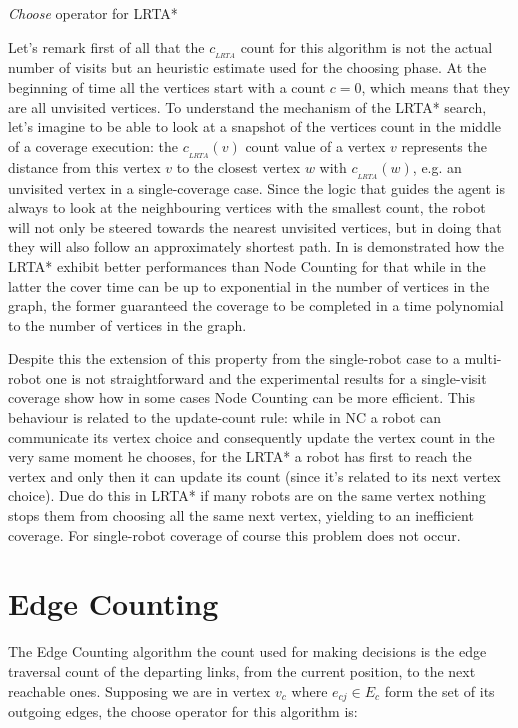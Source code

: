 \begin{algorithm}
\begin{algorithmic}[1]
 \label{a:find_next_lrta}
\label{eq:lrta_rule}
\end{algorithmic}
\caption{\emph{Choose} operator for LRTA*}\label{alg:rt_lrta}
\end{algorithm}

Let's remark first of all that the $c_{_{LRTA}}$ count for this algorithm is not the actual number of visits but an heuristic estimate used for the choosing phase. At the beginning of time all the vertices start with a count $c=0$, which means that they are all unvisited vertices. To understand the mechanism of the LRTA* search, let's imagine to be able to look at a snapshot of the vertices count in the middle of a coverage execution: the $c_{_{LRTA}}(v)$ count value of a vertex $v$ represents the distance from this vertex $v$ to the closest vertex $w$ with $c_{_{LRTA}}(w)$, e.g. an unvisited vertex in a single-coverage case. Since the logic that guides the agent is always to look at the neighbouring vertices with the smallest count, the robot will not only be steered towards the nearest unvisited vertices, but in doing that they will also follow an approximately shortest path.
In \cite{koenig2001} is demonstrated how the LRTA* exhibit better performances than Node Counting for that while in the latter the cover time can be up to exponential in the number of vertices in the graph, the former guaranteed the coverage to be completed in a time polynomial to the number of vertices in the graph.

Despite this the extension of this property from the single-robot case to a multi-robot one is not straightforward and the experimental results for a single-visit coverage show how in some cases Node Counting can be more efficient. This behaviour is related to the update-count rule: while in NC a robot can communicate its vertex choice and consequently update the vertex count in the very same moment he chooses, for the LRTA* a robot has first to reach the vertex and only then it can update its count (since it's related to its next vertex choice). Due do this in LRTA* if many robots are on the same vertex nothing stops them from choosing all the same next vertex, yielding to an inefficient coverage. For single-robot coverage of course this problem does not occur. 


\section{Edge Counting}
The Edge Counting algorithm the count used for making decisions is the edge traversal count of the departing links, from the current position, to the next reachable ones. Supposing we are in vertex $v_c$ where $e_{cj} \in E_c$ form the set of its outgoing edges, the choose operator for this algorithm is:

